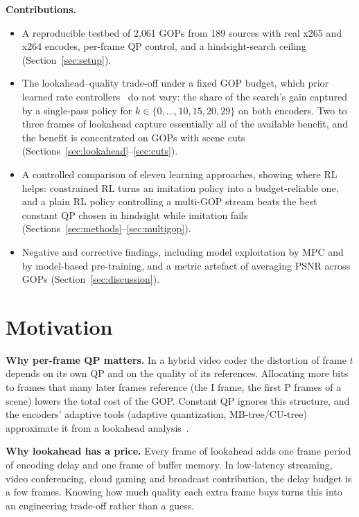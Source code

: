 \documentclass[conference]{IEEEtran}
\begin{document}
\textbf{Contributions.}
\begin{itemize}
\item A reproducible testbed of 2{,}061 GOPs from 189 sources with real x265 and x264 encodes, per-frame QP control, and a hindsight-search ceiling (Section~\ref{sec:setup}).
\item The lookahead--quality trade-off under a fixed GOP budget, which prior learned rate controllers~\cite{mao2020neural,mandhane2022muzero} do not vary: the share of the search's gain captured by a single-pass policy for $k \in \{0,\dots,10,15,20,29\}$ on both encoders. Two to three frames of lookahead capture essentially all of the available benefit, and the benefit is concentrated on GOPs with scene cuts (Sections~\ref{sec:lookahead}--\ref{sec:cuts}).
\item A controlled comparison of eleven learning approaches, showing where RL helps: constrained RL turns an imitation policy into a budget-reliable one, and a plain RL policy controlling a multi-GOP stream beats the best constant QP chosen in hindsight while imitation fails (Sections~\ref{sec:methods}--\ref{sec:multigop}).
\item Negative and corrective findings, including model exploitation by MPC and by model-based pre-training, and a metric artefact of averaging PSNR across GOPs (Section~\ref{sec:discussion}).
\end{itemize}

\section{Motivation}
\textbf{Why per-frame QP matters.} In a hybrid video coder the distortion of frame $t$ depends on its own QP and on the quality of its references. Allocating more bits to frames that many later frames reference (the I frame, the first P frames of a scene) lowers the total cost of the GOP. Constant QP ignores this structure, and the encoders' adaptive tools (adaptive quantization, MB-tree/CU-tree) approximate it from a lookahead analysis~\cite{garrett2009mbtree}.

\textbf{Why lookahead has a price.} Every frame of lookahead adds one frame period of encoding delay and one frame of buffer memory. In low-latency streaming, video conferencing, cloud gaming and broadcast contribution, the delay budget is a few frames. Knowing how much quality each extra frame buys turns this into an engineering trade-off rather than a guess.
\end{document}
